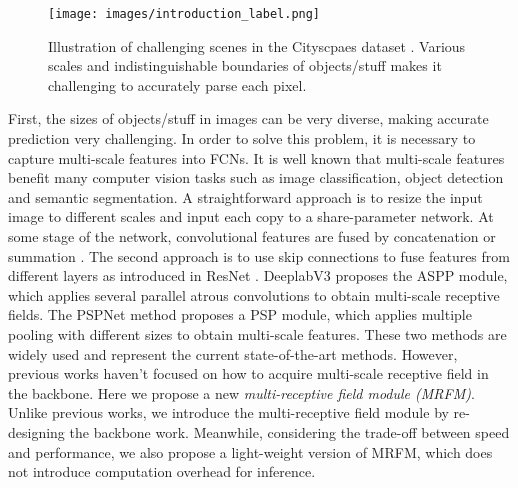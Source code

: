 \documentclass[final]{cvpr}
\begin{document}
\begin{figure}[t]
\setlength{\abovecaptionskip}{0.2cm}
\setlength{\belowcaptionskip}{-0.4cm}
\centering
\texttt{[image: images/introduction\_label.png]} \\
\vspace{-0.15cm}

\hspace{0.01cm}

\caption{Illustration of challenging scenes in the Cityscpaes dataset \cite{cityscpaes}.
Various scales and indistinguishable boundaries of objects/stuff makes it challenging to accurately
parse each pixel.}
\end{figure}



First, the sizes of objects/stuff in images can be very diverse, making accurate prediction very challenging.
In order to solve this problem, it is necessary to capture multi-scale features into FCNs.
It is well known that multi-scale features benefit many computer vision tasks such as image classification, object detection and
semantic segmentation. A straightforward approach is
to resize the input image to different scales and input each copy to
a share-parameter network. At some stage of the network, convolutional features are fused by concatenation or summation \cite{Lin2015Efficient}.
The second approach is to use skip connections to fuse features from different layers as introduced in ResNet \cite{ResNet}.
DeeplabV3 \cite{Deeplabv3} proposes the ASPP module, which applies several parallel atrous convolutions to obtain multi-scale receptive fields.
The PSPNet \cite{PSPNet} method proposes a PSP module, which applies multiple pooling with different sizes to obtain multi-scale features.
These two methods are widely used and represent the current state-of-the-art methods.
However, previous works haven't focused on how to acquire multi-scale receptive field in the backbone.
Here we propose a new \emph{multi-receptive field module (MRFM)}.
Unlike previous works, we introduce the  multi-receptive field module by re-designing the backbone work.
Meanwhile, considering the trade-off between speed and performance,
we also propose a light-weight version of MRFM, which does not introduce computation overhead for inference.
\end{document}
